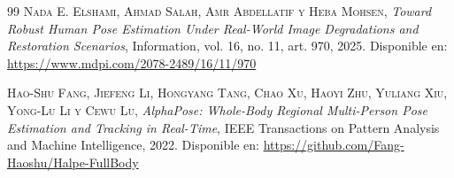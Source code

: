\begin{thebibliography}{99}
 \textsc{Nada E. Elshami, Ahmad Salah, Amr Abdellatif y Heba Mohsen}, \textit{Toward Robust Human Pose Estimation Under Real-World Image Degradations and Restoration Scenarios}, Information, vol. 16, no. 11, art. 970, 2025. Disponible en: \url{https://www.mdpi.com/2078-2489/16/11/970}

 \textsc{Hao-Shu Fang, Jiefeng Li, Hongyang Tang, Chao Xu, Haoyi Zhu, Yuliang Xiu, Yong-Lu Li y Cewu Lu}, \textit{AlphaPose: Whole-Body Regional Multi-Person Pose Estimation and Tracking in Real-Time}, IEEE Transactions on Pattern Analysis and Machine Intelligence, 2022. Disponible en: \url{https://github.com/Fang-Haoshu/Halpe-FullBody}

\end{thebibliography}
